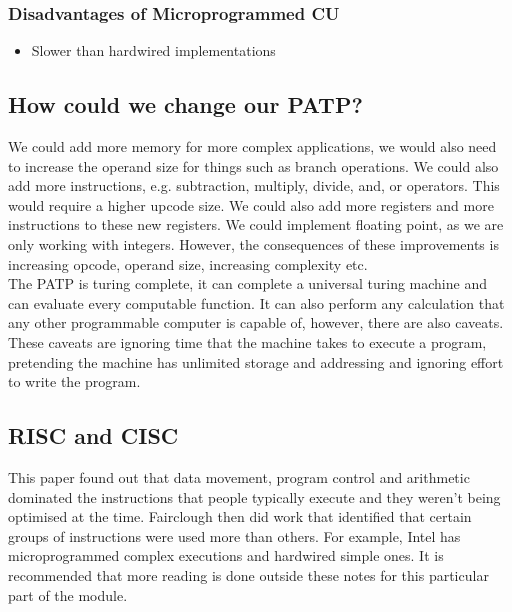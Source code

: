 \documentclass[a4paper]{article}
\theoremstyle{plain}
\theoremstyle{definition}
\theoremstyle{remark}
\begin{document}
\subsubsection{Disadvantages of Microprogrammed CU}
\begin{itemize}
	\item Slower than hardwired implementations
\end{itemize}
\subsection{How could we change our PATP?}
We could add more memory for more complex applications, we would also need to increase the operand size for things such as branch operations. We could also add more instructions, e.g. subtraction, multiply, divide, and, or operators. This would require a higher upcode size. We could also add more registers and more instructions to these new registers. We could implement floating point, as we are only working with integers. However, the consequences of these improvements is increasing opcode, operand size, increasing complexity etc. \\

The PATP is turing complete, it can complete a universal turing machine and can evaluate every computable function. It can also perform any calculation that any other programmable computer is capable of, however, there are also caveats. These caveats are ignoring time that the machine takes to execute a program, pretending the machine has unlimited storage and addressing and ignoring effort to write the program. 
\subsection{RISC and CISC}
This paper found out that data movement, program control and arithmetic dominated the instructions that people typically execute and they weren't being optimised at the time. Fairclough then did work that identified that certain groups of instructions were used more than others.
For example, Intel has microprogrammed complex executions and hardwired simple ones. It is recommended that more reading is done outside these notes for this particular part of the module.

\appendix
\end{document}
